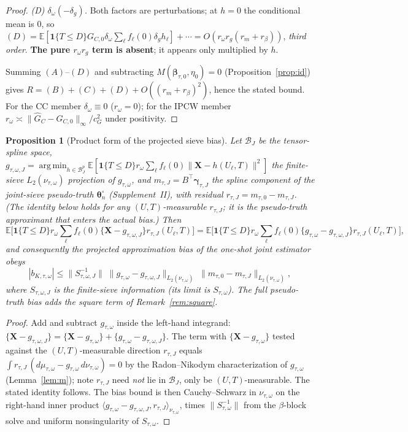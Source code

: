 \documentclass[11pt]{article}
\newtheorem{proposition}{Proposition}
\theoremstyle{remark}\newtheorem{remark}{Remark}
\newcommand{\E}{\mathbb{E}}
\newcommand{\X}{\bm{X}}
\newcommand{\bbeta}{\bm{\beta}}
\newcommand{\indc}[1]{\mathbf{1}\{#1\}}
\newcommand{\rom}{r_{\omega}}
\DeclareMathOperator*{\argmin}{arg\,min}
\begin{document}
\begin{proof}
\emph{(D) $\delta_\omega(-\delta_g)$.} Both factors are perturbations; at $h=0$
the conditional mean is $0$, so
$(D)=\E[\indc{T\le D}G_{C,0}\delta_\omega\sum_\ell f_\ell(0)\delta_g h_\ell]+\cdots
=O(r_\omega r_g(r_m+r_\beta))$, \emph{third order}. \textbf{The pure $r_\omega
r_g$ term is absent}; it appears only multiplied by $h$.

Summing $(A)$--$(D)$ and subtracting $M(\bbeta_{\tau,0},\eta_0)=0$
(Proposition~\ref{prop:id}) gives $R=(B)+(C)+(D)+O((r_m+r_\beta)^2)$, hence the
stated bound. For the CC member $\delta_\omega\equiv0$ ($r_\omega=0$); for the
IPCW member $r_\omega\asymp\|\widehat G_C-G_{C,0}\|_\infty/c_G^2$ under positivity.
\end{proof}

\begin{proposition}[Product form of the projected sieve bias]\label{prop:bias}
Let $\mathcal B_J$ be the tensor-spline space, $g_{\tau,\omega,J}=\argmin_{h\in
\mathcal B_J^p}\E[\indc{T\le D}\rom\sum_\ell f_\ell(0)\|\X-h(U_\ell,T)\|^2]$ the
finite-sieve $L_2(\nu_{\tau,\omega})$ projection of $g_{\tau,\omega}$, and
$m_{\tau,J}=B^\top\bm\gamma_{\tau,J}$ the spline component of the
\emph{joint-sieve pseudo-truth} $\bm\theta_n^\circ$ (Supplement~II), with residual
$r_{\tau,J}=m_{\tau,0}-m_{\tau,J}$. (The identity below holds for any
$(U,T)$-measurable $r_{\tau,J}$; it is the pseudo-truth approximant that enters
the actual bias.) Then
\[
\E\Big[\indc{T\le D}\rom\sum_\ell f_\ell(0)\{\X-g_{\tau,\omega,J}\}
   r_{\tau,J}(U_\ell,T)\Big]
=\E\Big[\indc{T\le D}\rom\sum_\ell f_\ell(0)\{g_{\tau,\omega}-g_{\tau,\omega,J}\}
   r_{\tau,J}(U_\ell,T)\Big],
\]
and consequently the projected approximation bias of the one-shot joint estimator
obeys
\[
|b_{K,\tau,\omega}|\le\|S_{\tau,\omega,J}^{-1}\|\;
\|g_{\tau,\omega}-g_{\tau,\omega,J}\|_{L_2(\nu_{\tau,\omega})}\;
\|m_{\tau,0}-m_{\tau,J}\|_{L_2(\nu_{\tau,\omega})},
\]
where $S_{\tau,\omega,J}$ is the finite-sieve information (its limit is
$S_{\tau,\omega}$). The full pseudo-truth bias adds the square term of
Remark~\ref{rem:square}.
\end{proposition}
\begin{proof}
Add and subtract $g_{\tau,\omega}$ inside the left-hand integrand:
$\{\X-g_{\tau,\omega,J}\}=\{\X-g_{\tau,\omega}\}+\{g_{\tau,\omega}
-g_{\tau,\omega,J}\}$. The term with $\{\X-g_{\tau,\omega}\}$ tested against the
$(U,T)$-measurable direction $r_{\tau,J}$ equals $\int r_{\tau,J}\,
(d\mu_{\tau,\omega}-g_{\tau,\omega}\,d\nu_{\tau,\omega})=0$ by the
Radon--Nikodym characterization of $g_{\tau,\omega}$ (Lemma~\ref{lem:m}); note
$r_{\tau,J}$ need \emph{not} lie in $\mathcal B_J$, only be $(U,T)$-measurable.
The stated identity follows. The bias bound is then Cauchy--Schwarz in
$\nu_{\tau,\omega}$ on the right-hand inner product
$\langle g_{\tau,\omega}-g_{\tau,\omega,J},r_{\tau,J}\rangle_{\nu_{\tau,\omega}}$,
times $\|S_{\tau,\omega}^{-1}\|$ from the $\beta$-block solve and uniform
nonsingularity of $S_{\tau,\omega}$.
\end{proof}
\end{document}

